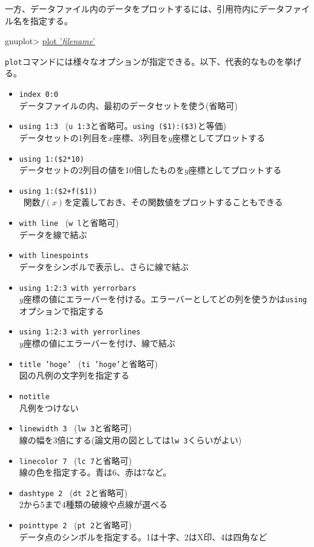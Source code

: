 一方、データファイル内のデータをプロットするには、引用符内にデータファイル名を指定する。
\begin{commandline2}
    gnuplot> \underline{plot '\textit{filename}'}
\end{commandline2} \noindent
\texttt{plot}コマンドには様々なオプションが指定できる。以下、代表的なものを挙げる。
\begin{itemize}
    \item \texttt{index 0:0} \\
          データファイルの内、最初のデータセットを使う(省略可)
    \item \texttt{using 1:3} \ (\texttt{u 1:3}と省略可。\texttt{using (\$1):(\$3)}と等価) \\
          データセットの1列目を\(x\)座標、3列目を\(y\)座標としてプロットする
    \item \texttt{using 1:(\$2*10)} \\
          データセットの2列目の値を10倍したものを\(y\)座標としてプロットする
    \item \texttt{using 1:(\$2+f(\$1))} \\\
          関数\(f(x)\)を定義しておき、その関数値をプロットすることもできる
    \item \texttt{with line} \ (\texttt{w l}と省略可) \\
          データを線で結ぶ
    \item \texttt{with linespoints} \\
          データをシンボルで表示し、さらに線で結ぶ
    \item \texttt{using 1:2:3 with yerrorbars} \\
          \(y\)座標の値にエラーバーを付ける。エラーバーとしてどの列を使うかは\texttt{using}オプションで指定する
    \item \texttt{using 1:2:3 with yerrorlines} \\
          \(y\)座標の値にエラーバーを付け、線で結ぶ
    \item \texttt{title 'hoge'} \ (\texttt{ti 'hoge'}と省略可) \\
          図の凡例の文字列を指定する
    \item \texttt{notitle} \\
          凡例をつけない
    \item \texttt{linewidth 3} \ (\texttt{lw 3}と省略可) \\
          線の幅を3倍にする(論文用の図としては\texttt{lw 3}くらいがよい)
    \item \texttt{linecolor 7} \ (\texttt{lc 7}と省略可) \\
          線の色を指定する。青は6、赤は7など。
    \item \texttt{dashtype 2} \ (\texttt{dt 2}と省略可) \\
          2から5まで4種類の破線や点線が選べる
    \item \texttt{pointtype 2} \ (\texttt{pt 2}と省略可) \\
          データ点のシンボルを指定する。1は十字、2はX印、4は四角など
\end{itemize}
